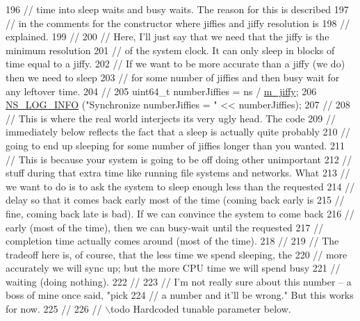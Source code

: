 \begin{DoxyCode}
196 \textcolor{comment}{// time into sleep waits and busy waits.  The reason for this is described}
197 \textcolor{comment}{// in the comments for the constructor where jiffies and jiffy resolution is}
198 \textcolor{comment}{// explained.}
199 \textcolor{comment}{//}
200 \textcolor{comment}{// Here, I'll just say that we need that the jiffy is the minimum resolution }
201 \textcolor{comment}{// of the system clock.  It can only sleep in blocks of time equal to a jiffy.}
202 \textcolor{comment}{// If we want to be more accurate than a jiffy (we do) then we need to sleep}
203 \textcolor{comment}{// for some number of jiffies and then busy wait for any leftover time.}
204 \textcolor{comment}{//}
205   uint64\_t numberJiffies = ns / \hyperlink{classns3_1_1WallClockSynchronizer_a2bf669a1ab0a9238dc67ad692b2dfc61}{m\_jiffy};
206   \hyperlink{group__logging_gafbd73ee2cf9f26b319f49086d8e860fb}{NS\_LOG\_INFO} (\textcolor{stringliteral}{"Synchronize numberJiffies = "} << numberJiffies);
207 \textcolor{comment}{//}
208 \textcolor{comment}{// This is where the real world interjects its very ugly head.  The code }
209 \textcolor{comment}{// immediately below reflects the fact that a sleep is actually quite probably}
210 \textcolor{comment}{// going to end up sleeping for some number of jiffies longer than you wanted.}
211 \textcolor{comment}{// This is because your system is going to be off doing other unimportant }
212 \textcolor{comment}{// stuff during that extra time like running file systems and networks.  What}
213 \textcolor{comment}{// we want to do is to ask the system to sleep enough less than the requested}
214 \textcolor{comment}{// delay so that it comes back early most of the time (coming back early is}
215 \textcolor{comment}{// fine, coming back late is bad).  If we can convince the system to come back}
216 \textcolor{comment}{// early (most of the time), then we can busy-wait until the requested}
217 \textcolor{comment}{// completion time actually comes around (most of the time).}
218 \textcolor{comment}{//}
219 \textcolor{comment}{// The tradeoff here is, of course, that the less time we spend sleeping, the}
220 \textcolor{comment}{// more accurately we will sync up; but the more CPU time we will spend busy}
221 \textcolor{comment}{// waiting (doing nothing).}
222 \textcolor{comment}{//}
223 \textcolor{comment}{// I'm not really sure about this number -- a boss of mine once said, "pick}
224 \textcolor{comment}{// a number and it'll be wrong."  But this works for now.}
225 \textcolor{comment}{//}
226 \textcolor{comment}{// \(\backslash\)todo Hardcoded tunable parameter below.}

\end{DoxyCode}
